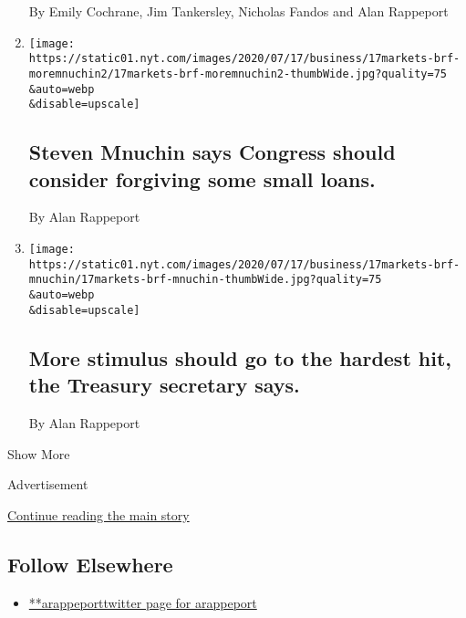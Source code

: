 \begin{enumerate}
  By Emily Cochrane, Jim Tankersley, Nicholas Fandos and Alan Rappeport
\item
  \href{/live/2020/07/17/business/stock-market-today-coronavirus/steven-mnuchin-says-congress-should-consider-forgiving-some-small-loans}{}

  \texttt{[image: https://static01.nyt.com/images/2020/07/17/business/17markets-brf-moremnuchin2/17markets-brf-moremnuchin2-thumbWide.jpg?quality=75\\\&auto=webp\\\&disable=upscale]}

  \hypertarget{steven-mnuchin-says-congress-should-consider-forgiving-some-small-loans}{%
  \subsection{Steven Mnuchin says Congress should consider forgiving
  some small
  loans.}\label{steven-mnuchin-says-congress-should-consider-forgiving-some-small-loans}}

  By Alan Rappeport
\item
  \href{/live/2020/07/17/business/stock-market-today-coronavirus/more-stimulus-should-go-to-the-hardest-hit-the-treasury-secretary-says}{}

  \texttt{[image: https://static01.nyt.com/images/2020/07/17/business/17markets-brf-mnuchin/17markets-brf-mnuchin-thumbWide.jpg?quality=75\\\&auto=webp\\\&disable=upscale]}

  \hypertarget{more-stimulus-should-go-to-the-hardest-hit-the-treasury-secretary-says}{%
  \subsection{More stimulus should go to the hardest hit, the Treasury
  secretary
  says.}\label{more-stimulus-should-go-to-the-hardest-hit-the-treasury-secretary-says}}

  By Alan Rappeport
\end{enumerate}

Show More

Advertisement

\protect\hyperlink{after-mid2}{Continue reading the main story}

\hypertarget{follow-elsewhere}{%
\subsection{Follow Elsewhere}\label{follow-elsewhere}}

\begin{itemize}
\tightlist
\item
  \href{https://twitter.com/arappeport}{**arappeporttwitter page for
  arappeport}
\end{itemize}

